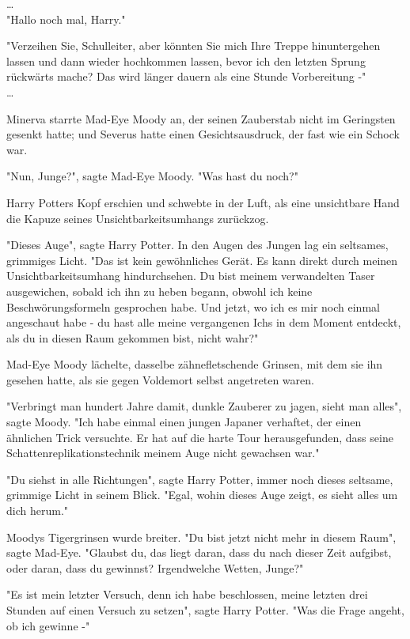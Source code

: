 {…\\ "Hallo noch mal, Harry."

"Verzeihen Sie, Schulleiter, aber könnten Sie mich Ihre Treppe hinuntergehen lassen und dann wieder hochkommen lassen, bevor ich den letzten Sprung rückwärts mache? Das wird länger dauern als eine Stunde Vorbereitung -"\\ …

Minerva starrte Mad-Eye Moody an, der seinen Zauberstab nicht im Geringsten gesenkt hatte; und Severus hatte einen Gesichtsausdruck, der fast wie ein Schock war.

"Nun, Junge?", sagte Mad-Eye Moody. "Was hast du noch?"

Harry Potters Kopf erschien und schwebte in der Luft, als eine unsichtbare Hand die Kapuze seines Unsichtbarkeitsumhangs zurückzog.

"Dieses Auge", sagte Harry Potter. In den Augen des Jungen lag ein seltsames, grimmiges Licht. "Das ist kein gewöhnliches Gerät. Es kann direkt durch meinen Unsichtbarkeitsumhang hindurchsehen. Du bist meinem verwandelten Taser ausgewichen, sobald ich ihn zu heben begann, obwohl ich keine Beschwörungsformeln gesprochen habe. Und jetzt, wo ich es mir noch einmal angeschaut habe - du hast alle meine vergangenen Ichs in dem Moment entdeckt, als du in diesen Raum gekommen bist, nicht wahr?"

Mad-Eye Moody lächelte, dasselbe zähnefletschende Grinsen, mit dem sie ihn gesehen hatte, als sie gegen Voldemort selbst angetreten waren.

"Verbringt man hundert Jahre damit, dunkle Zauberer zu jagen, sieht man alles", sagte Moody. "Ich habe einmal einen jungen Japaner verhaftet, der einen ähnlichen Trick versuchte. Er hat auf die harte Tour herausgefunden, dass seine Schattenreplikationstechnik meinem Auge nicht gewachsen war."

"Du siehst in alle Richtungen", sagte Harry Potter, immer noch dieses seltsame, grimmige Licht in seinem Blick. "Egal, wohin dieses Auge zeigt, es sieht alles um dich herum."

Moodys Tigergrinsen wurde breiter. "Du bist jetzt nicht mehr in diesem Raum", sagte Mad-Eye. "Glaubst du, das liegt daran, dass du nach dieser Zeit aufgibst, oder daran, dass du gewinnst? Irgendwelche Wetten, Junge?"

"Es ist mein letzter Versuch, denn ich habe beschlossen, meine letzten drei Stunden auf einen Versuch zu setzen", sagte Harry Potter. "Was die Frage angeht, ob ich gewinne -"

}
